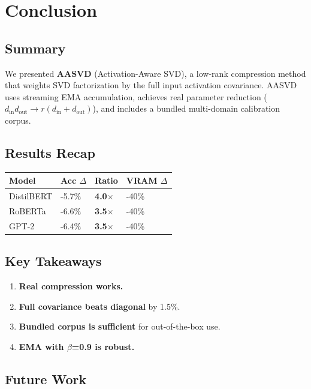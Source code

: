 
\section{Conclusion}

\subsection{Summary}

We presented \textbf{AASVD} (Activation-Aware SVD), a low-rank compression method 
that weights SVD factorization by the full input activation covariance. AASVD 
uses streaming EMA accumulation, achieves real parameter reduction 
($d_\text{in} d_\text{out} \to r(d_\text{in} + d_\text{out})$), and includes 
a bundled multi-domain calibration corpus.

\subsection{Results Recap}

\begin{table}[H]
\centering
\small
\begin{tabular}{llll}
\toprule
\textbf{Model} & \textbf{Acc $\Delta$} & \textbf{Ratio} & \textbf{VRAM $\Delta$} \\
\midrule
DistilBERT & -5.7\% & \textbf{4.0$\times$} & -40\% \\
RoBERTa & -6.6\% & \textbf{3.5$\times$} & -40\% \\
GPT-2 & -6.4\% & \textbf{3.5$\times$} & -40\% \\
\bottomrule
\end{tabular}
\end{table}

\subsection{Key Takeaways}

\begin{enumerate}
\item \textbf{Real compression works.}
\item \textbf{Full covariance beats diagonal} by 1.5\%.
\item \textbf{Bundled corpus is sufficient} for out-of-the-box use.
\item \textbf{EMA with $\beta$=0.9 is robust.}

\end{enumerate}
\subsection{Future Work}

